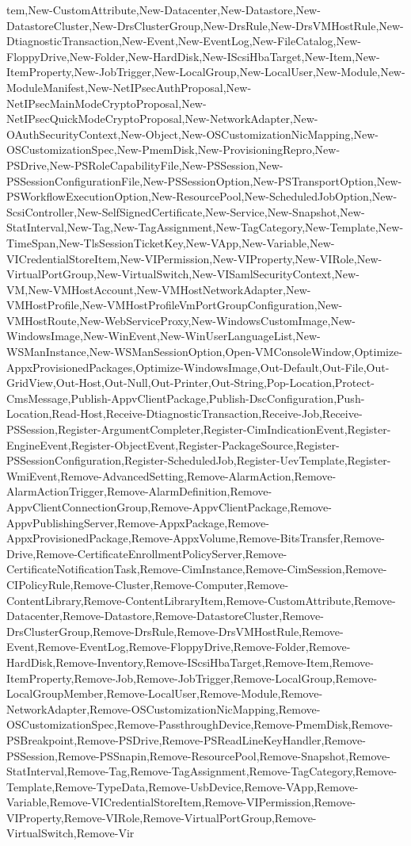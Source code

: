 {{tem,New-CustomAttribute,New-Datacenter,New-Datastore,New-DatastoreCluster,New-DrsClusterGroup,New-DrsRule,New-DrsVMHostRule,New-DtiagnosticTransaction,New-Event,New-EventLog,New-FileCatalog,New-FloppyDrive,New-Folder,New-HardDisk,New-IScsiHbaTarget,New-Item,New-ItemProperty,New-JobTrigger,New-LocalGroup,New-LocalUser,New-Module,New-ModuleManifest,New-NetIPsecAuthProposal,New-NetIPsecMainModeCryptoProposal,New-NetIPsecQuickModeCryptoProposal,New-NetworkAdapter,New-OAuthSecurityContext,New-Object,New-OSCustomizationNicMapping,New-OSCustomizationSpec,New-PmemDisk,New-ProvisioningRepro,New-PSDrive,New-PSRoleCapabilityFile,New-PSSession,New-PSSessionConfigurationFile,New-PSSessionOption,New-PSTransportOption,New-PSWorkflowExecutionOption,New-ResourcePool,New-ScheduledJobOption,New-ScsiController,New-SelfSignedCertificate,New-Service,New-Snapshot,New-StatInterval,New-Tag,New-TagAssignment,New-TagCategory,New-Template,New-TimeSpan,New-TlsSessionTicketKey,New-VApp,New-Variable,New-VICredentialStoreItem,New-VIPermission,New-VIProperty,New-VIRole,New-VirtualPortGroup,New-VirtualSwitch,New-VISamlSecurityContext,New-VM,New-VMHostAccount,New-VMHostNetworkAdapter,New-VMHostProfile,New-VMHostProfileVmPortGroupConfiguration,New-VMHostRoute,New-WebServiceProxy,New-WindowsCustomImage,New-WindowsImage,New-WinEvent,New-WinUserLanguageList,New-WSManInstance,New-WSManSessionOption,Open-VMConsoleWindow,Optimize-AppxProvisionedPackages,Optimize-WindowsImage,Out-Default,Out-File,Out-GridView,Out-Host,Out-Null,Out-Printer,Out-String,Pop-Location,Protect-CmsMessage,Publish-AppvClientPackage,Publish-DscConfiguration,Push-Location,Read-Host,Receive-DtiagnosticTransaction,Receive-Job,Receive-PSSession,Register-ArgumentCompleter,Register-CimIndicationEvent,Register-EngineEvent,Register-ObjectEvent,Register-PackageSource,Register-PSSessionConfiguration,Register-ScheduledJob,Register-UevTemplate,Register-WmiEvent,Remove-AdvancedSetting,Remove-AlarmAction,Remove-AlarmActionTrigger,Remove-AlarmDefinition,Remove-AppvClientConnectionGroup,Remove-AppvClientPackage,Remove-AppvPublishingServer,Remove-AppxPackage,Remove-AppxProvisionedPackage,Remove-AppxVolume,Remove-BitsTransfer,Remove-Drive,Remove-CertificateEnrollmentPolicyServer,Remove-CertificateNotificationTask,Remove-CimInstance,Remove-CimSession,Remove-CIPolicyRule,Remove-Cluster,Remove-Computer,Remove-ContentLibrary,Remove-ContentLibraryItem,Remove-CustomAttribute,Remove-Datacenter,Remove-Datastore,Remove-DatastoreCluster,Remove-DrsClusterGroup,Remove-DrsRule,Remove-DrsVMHostRule,Remove-Event,Remove-EventLog,Remove-FloppyDrive,Remove-Folder,Remove-HardDisk,Remove-Inventory,Remove-IScsiHbaTarget,Remove-Item,Remove-ItemProperty,Remove-Job,Remove-JobTrigger,Remove-LocalGroup,Remove-LocalGroupMember,Remove-LocalUser,Remove-Module,Remove-NetworkAdapter,Remove-OSCustomizationNicMapping,Remove-OSCustomizationSpec,Remove-PassthroughDevice,Remove-PmemDisk,Remove-PSBreakpoint,Remove-PSDrive,Remove-PSReadLineKeyHandler,Remove-PSSession,Remove-PSSnapin,Remove-ResourcePool,Remove-Snapshot,Remove-StatInterval,Remove-Tag,Remove-TagAssignment,Remove-TagCategory,Remove-Template,Remove-TypeData,Remove-UsbDevice,Remove-VApp,Remove-Variable,Remove-VICredentialStoreItem,Remove-VIPermission,Remove-VIProperty,Remove-VIRole,Remove-VirtualPortGroup,Remove-VirtualSwitch,Remove-Vir}}

